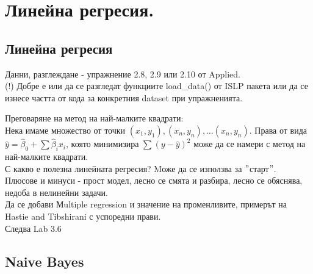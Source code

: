 \section{Линейна регресия.}
 	
	\subsection{Линейна регресия}
	
	
	
	Данни, разглеждане - упражнение 2.8, 2.9 или 2.10 от Applied. \\
	(!) Добре е или да се разгледат функциите load\_data() от ISLP пакета или
	да се изнесе частта от кода за конкретния dataset при упражненията.
	
	Преговаряне на метод на най-малките квадрати: \\
	Нека имаме множество от точки $(x_1,y_1), (x_n,y_n), \dots (x_n,y_n)$. 
	Права от вида $\hat y = \hat \beta_0 + \sum \hat \beta_i  x_i $, която минимизира $\sum (y-\hat{y})^2$  може да се намери с метод на най-малките квадрати. \\
	С какво е полезна линейната регресия? Mоже да се използва за $"$старт$"$.\\
	Плюсове и минуси - прост модел, лесно се смята и разбира, лесно се обяснява, недоба в нелинейни задачи. \\
	
	Да се добави Мultiple regression и значение на променливите, примерът на Hastie and Tibshirani с успоредни прави. \\
	
	Следва Lab 3.6 
	
	\subsection{Naive Bayes}
	
